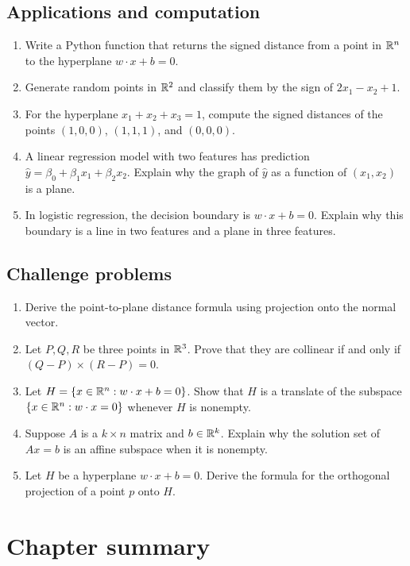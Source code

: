 \subsection*{Applications and computation}
\begin{enumerate}[resume]
\item Write a Python function that returns the signed distance from a point in $\mathbb{R}^n$ to the hyperplane $w\cdot x+b=0$.
\item Generate random points in $\mathbb{R}^2$ and classify them by the sign of $2x_1-x_2+1$.
\item For the hyperplane $x_1+x_2+x_3=1$, compute the signed distances of the points $(1,0,0)$, $(1,1,1)$, and $(0,0,0)$.
\item A linear regression model with two features has prediction $\widehat y=\beta_0+\beta_1x_1+\beta_2x_2$. Explain why the graph of $\widehat y$ as a function of $(x_1,x_2)$ is a plane.
\item In logistic regression, the decision boundary is $w\cdot x+b=0$. Explain why this boundary is a line in two features and a plane in three features.
\end{enumerate}

\subsection*{Challenge problems}
\begin{enumerate}[resume]
\item Derive the point-to-plane distance formula using projection onto the normal vector.
\item Let $P,Q,R$ be three points in $\mathbb{R}^3$. Prove that they are collinear if and only if $(Q-P)\times(R-P)=0$.
\item Let $H=\{x\in\mathbb{R}^n:w\cdot x+b=0\}$. Show that $H$ is a translate of the subspace $\{x\in\mathbb{R}^n:w\cdot x=0\}$ whenever $H$ is nonempty.
\item Suppose $A$ is a $k\times n$ matrix and $b\in\mathbb{R}^k$. Explain why the solution set of $Ax=b$ is an affine subspace when it is nonempty.
\item Let $H$ be a hyperplane $w\cdot x+b=0$. Derive the formula for the orthogonal projection of a point $p$ onto $H$.
\end{enumerate}

\section{Chapter summary}

